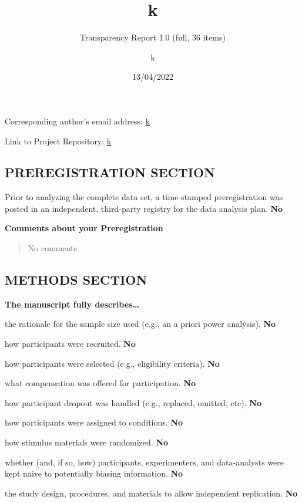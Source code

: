 \documentclass[
  ,
]{article}
\title{k}
\subtitle{Transparency Report 1.0 (full, 36 items)}
\author{k}
\date{13/04/2022}
\begin{document}
\maketitle

Corresponding author's email address: \url{k}

Link to Project Repository: \url{k}

\hypertarget{preregistration-section}{%
\subsection{PREREGISTRATION SECTION}\label{preregistration-section}}

Prior to analyzing the complete data set, a time-stamped preregistration
was posted in an independent, third-party registry for the data analysis
plan. \hfill  \textbf{No}

\textbf{Comments about your Preregistration}

\begin{quote}
No comments.
\end{quote}

\newpage

\hypertarget{methods-section}{%
\subsection{METHODS SECTION}\label{methods-section}}

\textbf{The manuscript fully describes\ldots{}}

the rationale for the sample size used (e.g., an a priori power
analysis). \hfill  \textbf{No}

how participants were recruited. \hfill  \textbf{No}

how participants were selected (e.g., eligibility criteria).
\hfill  \textbf{No}

what compensation was offered for participation. \hfill  \textbf{No}

how participant dropout was handled (e.g., replaced, omitted, etc).
\hfill  \textbf{No}

how participants were assigned to conditions. \hfill  \textbf{No}

how stimulus materials were randomized. \hfill  \textbf{No}

whether (and, if so, how) participants, experimenters, and data-analysts
were kept naive to potentially biasing information. \hfill  \textbf{No}

the study design, procedures, and materials to allow independent
replication. \hfill  \textbf{No}
\end{document}
